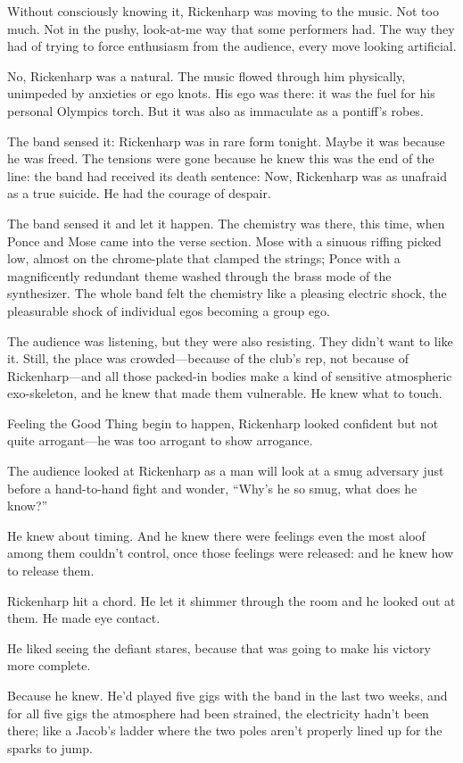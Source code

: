 Without consciously knowing it, Rickenharp was moving to the music. Not too much. Not in the pushy, look-at-me way that some performers had. The way they had of trying to force enthusiasm from the audience, every move looking artificial.

No, Rickenharp was a natural. The music flowed through him physically, unimpeded by anxieties or ego knots. His ego was there: it was the fuel for his personal Olympics torch. But it was also as immaculate as a pontiff’s robes.

The band sensed it: Rickenharp was in rare form tonight. Maybe it was because he was freed. The tensions were gone because he knew this was the end of the line: the band had received its death sentence: Now, Rickenharp was as unafraid as a true suicide. He had the courage of despair.

The band sensed it and let it happen. The chemistry was there, this time, when Ponce and Mose came into the verse section. Mose with a sinuous riffing picked low, almost on the chrome-plate that clamped the strings; Ponce with a magnificently redundant theme washed through the brass mode of the synthesizer. The whole band felt the chemistry like a pleasing electric shock, the pleasurable shock of individual egos becoming a group ego.

The audience was listening, but they were also resisting. They didn’t want to like it. Still, the place was crowded—because of the club’s rep, not because of Rickenharp—and all those packed-in bodies make a kind of sensitive atmospheric exo-skeleton, and he knew that made them vulnerable. He knew what to touch.

Feeling the Good Thing begin to happen, Rickenharp looked confident but not quite arrogant—he was too arrogant to show arrogance.

The audience looked at Rickenharp as a man will look at a smug adversary just before a hand-to-hand fight and wonder, “Why’s he so smug, what does he know?”

He knew about timing. And he knew there were feelings even the most aloof among them couldn’t control, once those feelings were released: and he knew how to release them.

Rickenharp hit a chord. He let it shimmer through the room and he looked out at them. He made eye contact.

He liked seeing the defiant stares, because that was going to make his victory more complete.

Because he knew. He’d played five gigs with the band in the last two weeks, and for all five gigs the atmosphere had been strained, the electricity hadn’t been there; like a Jacob’s ladder where the two poles aren’t properly lined up for the sparks to jump.

